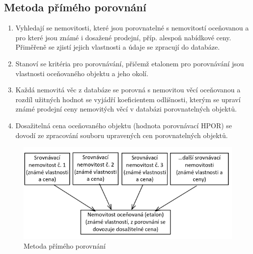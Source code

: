 \subsection{Metoda přímého porovnání}
\begin{enumerate}
    \item Vyhledají se nemovitosti, které jsou porovnatelné s nemovitostí
    oceňovanou a pro které jsou známé i dosažené prodejní, příp. alespoň
    nabídkové ceny. Přiměřeně se zjistí jejich vlastnosti a údaje se zpracují do
    databáze.
    \item Stanoví se kritéria pro porovnávání, přičemž etalonem pro porovnávání jsou
    vlastnosti oceňovaného objektu a jeho okolí.
    \item Každá nemovitá věc z databáze se porovná s nemovitou věcí oceňovanou a
    rozdíl užitných hodnot se vyjádří koeficientem odlišnosti, kterým se upraví
    známé prodejní ceny nemovitých věcí v databázi porovnatelných objektů.
    \item Dosažitelná cena oceňovaného objektu (hodnota porovnávací HPOR) se
    dovodí ze zpracování souboru upravených cen porovnatelných objektů.
\end{enumerate}
\begin{figure}[h]
    \centering
    \includegraphics[scale=0.5]{images/porovnani.png}
    \caption{Metoda přímého porovnání}
    \label{fig:porovnani}
\end{figure}
